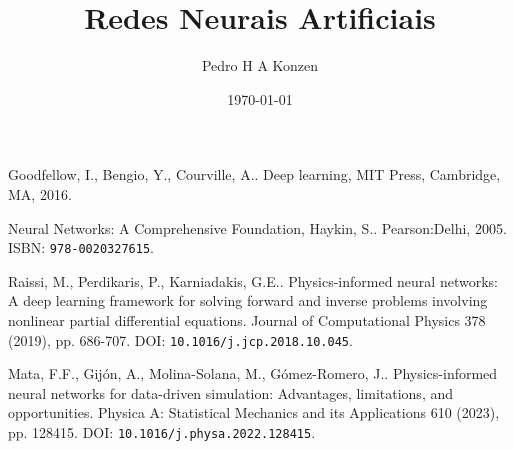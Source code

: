 \documentclass[12pt]{book}
\begin{document}
\frontmatter

\title{Redes Neurais Artificiais}
\author{Pedro H A Konzen}
\date{\today}
\ifishtml
\else
{}
\fi

\maketitle





\tableofcontents
{}

\mainmatter





\ifisbook

\fi

% 

\begin{thebibliography}{99}
  Goodfellow, I., Bengio, Y., Courville, A.. Deep learning, {MIT} Press, Cambridge, {MA}, 2016.

  Neural Networks: A Comprehensive Foundation, Haykin, S.. Pearson:Delhi, 2005. ISBN: \texttt{978-0020327615}.

  Raissi, M., Perdikaris, P., Karniadakis, G.E.. Physics-informed neural networks: A deep learning framework for solving forward and inverse problems involving nonlinear partial differential equations. Journal of Computational Physics 378 (2019), pp. 686-707. DOI: \texttt{10.1016/j.jcp.2018.10.045}.

  Mata, F.F., Gijón, A., Molina-Solana, M., Gómez-Romero, J.. Physics-informed neural networks for data-driven simulation: Advantages, limitations, and opportunities. Physica A: Statistical Mechanics and its Applications 610 (2023), pp. 128415. DOI: \texttt{10.1016/j.physa.2022.128415}.

\end{thebibliography}
\end{document}
